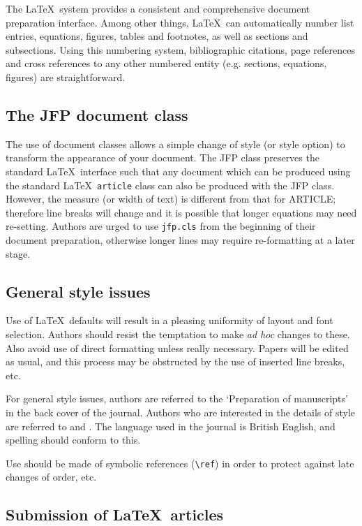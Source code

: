 \documentclass{jfp}
\begin{document}
The \LaTeX\ system provides a consistent and comprehensive document preparation
interface. Among other things, \LaTeX\ can automatically number list
entries, equations, figures, tables and footnotes, as well as sections and
subsections. Using this numbering system, bibliographic citations, page
references and cross references to any other numbered entity (e.g. sections,
equations, figures) are straightforward.

\subsection{The JFP document class}

The use of document classes allows a simple change of style (or style option)
to transform the appearance of your document. The JFP class preserves the
standard \LaTeX\ interface such that any document which can be produced
using the standard \LaTeX\ \verb"article" class can also be produced with
the JFP class.
However, the measure (or width of text) is different from that
for ARTICLE; therefore line breaks will change and it is possible that
longer equations may need re-setting.
Authors are urged to use \verb"jfp.cls" from the beginning of their document
preparation, otherwise longer lines may require re-formatting at a later stage.

\subsection{General style issues}

Use of \LaTeX\ defaults will result in a pleasing uniformity of layout
and font selection. Authors should resist the temptation to make
\emph{ad hoc} changes to these. Also avoid use of direct formatting unless
really necessary. Papers will be edited as usual, and this process may be
obstructed by the use of inserted line breaks, etc.

For general style issues, authors are referred to the `Preparation of
manuscripts' in the back cover of the journal. Authors who are interested in
the details of style are referred to \cite{Butcher} and \cite{Chicago}. The
language used in the journal is British English, and spelling should conform
to this.

Use should be made of symbolic references (\verb"\ref") in order to
protect against late changes of order, etc.

\subsection{Submission of \LaTeX\ articles}
\end{document}
